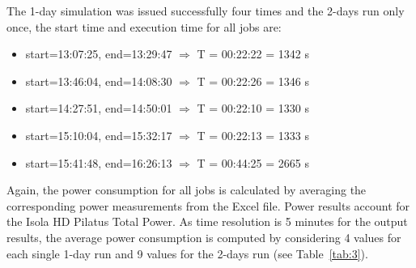 The 1-day simulation was issued successfully four times and the 2-days
run only once, the start time and execution time for all jobs are:
\begin{itemize}
\item start=13:07:25, end=13:29:47 $\Rightarrow$ T = 00:22:22 = 1342 s
\item start=13:46:04, end=14:08:30 $\Rightarrow$ T = 00:22:26 = 1346 s
\item start=14:27:51, end=14:50:01 $\Rightarrow$ T = 00:22:10 = 1330 s
\item start=15:10:04, end=15:32:17 $\Rightarrow$ T = 00:22:13 = 1333 s
\item start=15:41:48, end=16:26:13 $\Rightarrow$ T = 00:44:25 = 2665 s
\end{itemize}

Again, the power  consumption for all jobs is  calculated by averaging
the  corresponding  power  measurements  from the  Excel  file.  Power
results  account  for  the  Isola  HD Pilatus  Total  Power.  As  time
resolution  is 5  minutes for  the output  results, the  average power
consumption is computed by considering  4 values for each single 1-day
run and 9 values for the 2-days run (see Table~\ref{tab:3}).

